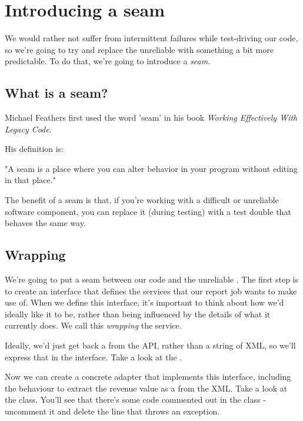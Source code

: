 \chapter*{Introducing a seam}

We would rather not suffer from intermittent failures while test-driving our code, so we're going to try and replace the unreliable \texttt{\ShoutyStatsService} with something a bit more predictable. To do that, we're going to introduce a \emph{seam}.

\section*{What is a seam?}

Michael Feathers first used the word 'seam' in his book \textit{Working Effectively With Legacy Code}.

His definition is:

\begin{framed}
"A seam is a place where you can alter behavior in your program without editing in that place."
\end{framed}

The benefit of a seam is that, if you're working with a difficult or unreliable software component, you can replace it (during testing) with a test double that behaves the same way.

\section*{Wrapping \texttt{\ShoutyStatsService}}

We're going to put a seam between our code and the unreliable \texttt{\ShoutyStatsService}. The first step is to create an interface that defines the services that our report job wants to make use of. When we define this interface, it's important to think about how we'd ideally like it to be, rather than being influenced by the details of what it currently does. We call this \emph{wrapping} the service.

Ideally, we'd just get back a \texttt{} from the API, rather than a string of XML, so we'll express that in the interface. Take a look at the \texttt{\RevenueProviderInterface} .

Now we can create a concrete adapter that implements this interface, including the behaviour to extract the revenue value as a \texttt{} from the XML. Take a look at the \texttt{\ProductionRevenueProvider} class. You'll see that there's some code commented out in the class - uncomment it and delete the line that throws an exception.

